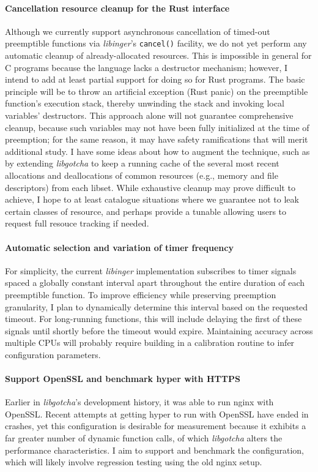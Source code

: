 \documentclass[12pt,letterpaper,openright]{report}
\begin{document}
\paragraph{Cancellation resource cleanup for the Rust interface}
Although we currently support asynchronous cancellation of timed-out preemptible
functions via \textit{libinger}'s \texttt{cancel()} facility, we do not yet perform
any automatic cleanup of already-allocated resources.  This is impossible
in general for C programs because the language lacks a destructor mechanism; however,
I intend to add at least partial support for doing so for Rust programs.  The basic
principle will be to throw an artificial exception (Rust panic) on the preemptible
function's execution stack, thereby unwinding the stack and invoking local variables'
destructors.  This approach alone will not guarantee comprehensive cleanup, because
such variables may not have been fully initialized at the time of preemption; for the
same reason, it may have safety ramifications that will merit additional study.  I
have some ideas about how to augment the technique, such as by extending
\textit{libgotcha} to keep a running cache of the several most recent allocations and
deallocations of common resources (e.g., memory and file descriptors) from each
libset.  While exhaustive cleanup may prove difficult to achieve, I hope to at least
catalogue situations where we guarantee not to leak certain classes of resource, and
perhaps provide a tunable allowing users to request full resouce tracking if needed.

\paragraph{Automatic selection and variation of timer frequency}
For simplicity, the current \textit{libinger} implementation subscribes to timer
signals spaced a globally constant interval apart throughout the entire duration of
each preemptible function.  To improve efficiency while preserving preemption
granularity, I plan to dynamically determine this interval based on the requested
timeout.  For long-running functions, this will include delaying the first of these
signals until shortly before the timeout would expire.  Maintaining accuracy across
multiple CPUs will probably require building in a calibration routine to infer
configuration parameters.

\paragraph{Support OpenSSL and benchmark hyper with HTTPS}
Earlier in \textit{libgotcha}'s development history, it was able to run nginx with
OpenSSL.  Recent attempts at getting hyper to run with OpenSSL have ended in crashes,
yet this configuration is desirable for measurement because it exhibits a far greater
number of dynamic function calls, of which \textit{libgotcha} alters the performance
characteristics.  I aim to support and benchmark the configuration, which will likely
involve regression testing using the old nginx setup.
\end{document}
